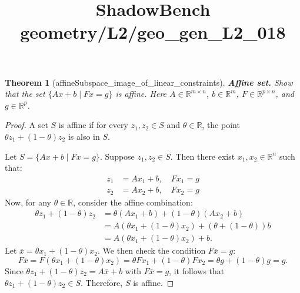 \documentclass{article}
\title{ShadowBench geometry/L2/geo\_gen\_L2\_018}
\newtheorem{theorem}{Theorem}
\begin{document}
\maketitle

\begin{theorem}[affineSubspace_image_of_linear_constraints]
\textbf{Affine set.} Show that the set $\{Ax + b \mid Fx = g\}$ is affine. Here $A \in \mathbb{R}^{m \times n}$, $b \in \mathbb{R}^m$, $F \in \mathbb{R}^{p \times n}$, and $g \in \mathbb{R}^p$.
\end{theorem}

\begin{proof}
A set $S$ is affine if for every $z_1, z_2 \in S$ and $\theta \in \mathbb{R}$, the point $\theta z_1 + (1 - \theta)z_2$ is also in $S$.

Let $S = \{Ax + b \mid Fx = g\}$. Suppose $z_1, z_2 \in S$. Then there exist $x_1, x_2 \in \mathbb{R}^n$ such that:
\begin{align*}
z_1 &= Ax_1 + b, \quad Fx_1 = g \\
z_2 &= Ax_2 + b, \quad Fx_2 = g
\end{align*}
Now, for any $\theta \in \mathbb{R}$, consider the affine combination:
\begin{align*}
\theta z_1 + (1 - \theta)z_2 &= \theta(Ax_1 + b) + (1 - \theta)(Ax_2 + b) \\
&= A(\theta x_1 + (1 - \theta)x_2) + (\theta + (1 - \theta))b \\
&= A(\theta x_1 + (1 - \theta)x_2) + b.
\end{align*}
Let $\bar{x} = \theta x_1 + (1 - \theta)x_2$. We then check the condition $F\bar{x} = g$:
\[
F\bar{x} = F(\theta x_1 + (1 - \theta)x_2) = \theta Fx_1 + (1 - \theta)Fx_2 = \theta g + (1 - \theta)g = g.
\]
Since $\theta z_1 + (1 - \theta)z_2 = A\bar{x} + b$ with $F\bar{x} = g$, it follows that $\theta z_1 + (1 - \theta)z_2 \in S$. Therefore, $S$ is affine.
\end{proof}
\end{document}
